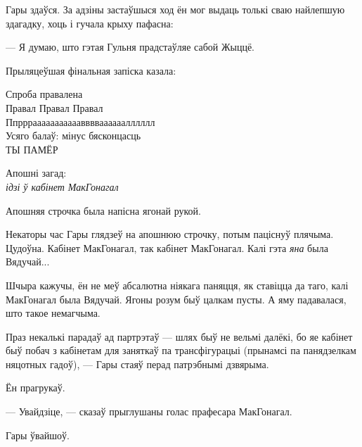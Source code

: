 Гары здаўся. За адзіны застаўшыся ход ён мог выдаць толькі сваю найлепшую здагадку,
хоць і гучала крыху пафасна:

--- Я думаю, што гэтая Гульня прадстаўляе сабой Жыццё.

Прыляцеўшая фінальная запіска казала:

\begin{writtenNoteGame}
Спроба правалена\\
Правал Правал Правал\\
Ппрррааааааааааавввваааааалллллл\\
Усяго балаў: мінус бясконцасць\\
\MakeUppercase{Ты памёр}

\hpFontFasthand{}Апошні загад:\\
\emph{ідзі ў кабінет МакГонагал}
\end{writtenNoteGame}

Апошняя строчка была напісна ягонай рукой.

Некаторы час Гары глядзеў на апошнюю строчку, потым паціснуў плячыма. Цудоўна.
Кабінет МакГонагал, так кабінет МакГонагал. Калі гэта \emph{яна} была Вядучай...

Шчыра кажучы, ён не меў абсалютна ніякага паняцця, як ставіцца да таго, калі 
МакГонагал была Вядучай. Ягоны розум быў цалкам пусты. А яму падавалася, што 
такое немагчыма.

Праз некалькі парадаў ад партрэтаў --- шлях быў не вельмі далёкі, бо яе кабінет быў
побач з кабінетам для заняткаў па трансфігурацыі (прынамсі па панядзелкам няцотных
гадоў), --- Гары стаяў перад патрэбнымі дзвярыма.

Ён прагрукаў.

--- Увайдзіце, --- сказаў прыглушаны голас прафесара МакГонагал.

Гары ўвайшоў.
